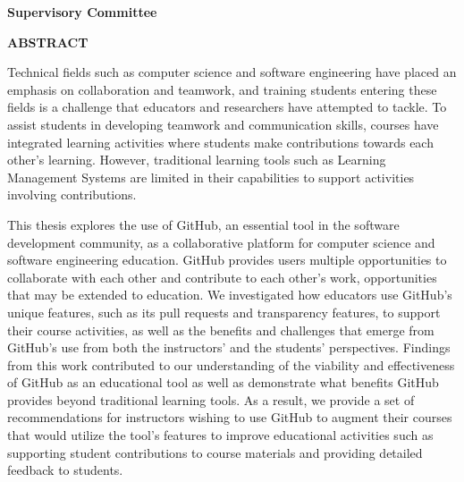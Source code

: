 \newpage
{}

\noindent \textbf{Supervisory Committee}
\tpbreak
\panel

\begin{center}
\textbf{ABSTRACT}
\end{center}


Technical fields such as computer science and software engineering have placed an emphasis on collaboration and teamwork, and training students entering these fields is a challenge that educators and researchers have attempted to tackle. To assist students in developing teamwork and communication skills, courses have integrated learning activities where students make contributions towards each other's learning. However, traditional learning tools such as Learning Management Systems are limited in their capabilities to support activities involving contributions.

This thesis explores the use of GitHub, an essential tool in the software development community, as a collaborative platform for computer science and software engineering education. GitHub provides users multiple opportunities to collaborate with each other and contribute to each other's work, opportunities that may be extended to education. We investigated how educators use GitHub's unique features, such as its pull requests and transparency features, to support their course activities, as well as the benefits and challenges that emerge from GitHub's use from both the instructors' and the students' perspectives. Findings from this work contributed to our understanding of the viability and effectiveness of GitHub as an educational tool as well as demonstrate what benefits GitHub provides beyond traditional learning tools. As a result, we provide a set of recommendations for instructors wishing to use GitHub to augment their courses that would utilize the tool's features to improve educational activities such as supporting student contributions to course materials and providing detailed feedback to students.
